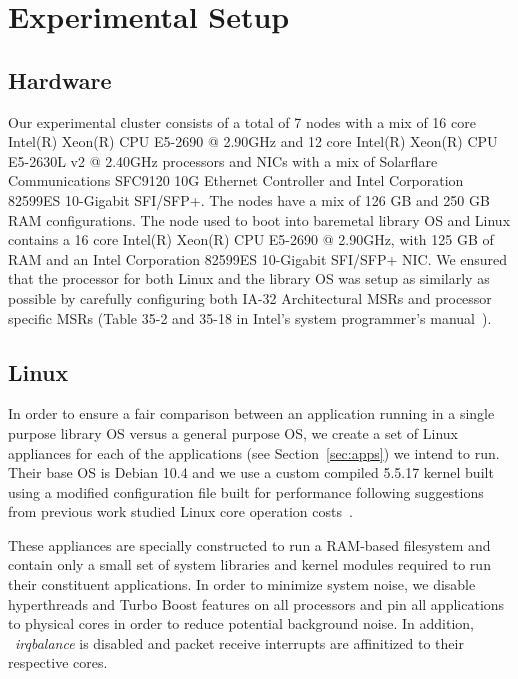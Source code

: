 

\section{Experimental Setup}
\label{sec:exp_setup}
\subsection{Hardware}
Our experimental cluster consists of a total of 7 nodes with a mix of 16 core
Intel(R) Xeon(R) CPU E5-2690 @ 2.90GHz and 12 core Intel(R) Xeon(R) CPU
E5-2630L v2 @ 2.40GHz processors and NICs with a mix of Solarflare
Communications SFC9120 10G Ethernet Controller and Intel Corporation 82599ES
10-Gigabit SFI/SFP+.
The nodes have a mix of 126 GB and 250 GB RAM configurations.
The node used to boot into baremetal library OS and Linux contains a 16 core
Intel(R) Xeon(R) CPU E5-2690 @ 2.90GHz, with 125 GB of RAM and an Intel
Corporation 82599ES 10-Gigabit SFI/SFP+ NIC.
We ensured that the processor for both Linux and the library OS was setup as
similarly as possible by carefully configuring both IA-32 Architectural MSRs
and processor specific MSRs (Table 35-2 and 35-18 in Intel's system
programmer's manual~\cite{intel_msr}).

\subsection{Linux}
In order to ensure a fair comparison between an application running in a single
purpose library OS versus a general purpose OS, we create a set of Linux
appliances for each of the applications (see Section~\ref{sec:apps}) we intend
to run.
Their base OS is Debian 10.4 and we use a custom compiled 5.5.17 kernel built
using a modified configuration file built for performance following suggestions
from previous work studied Linux core operation
costs~\cite{10.1145/3341301.3359640}.

These appliances are specially constructed to run a RAM-based filesystem and
contain only a small set of system libraries and kernel modules required to run
their constituent applications. In order to minimize system noise, we disable
hyperthreads and Turbo Boost features on all  processors and pin all
applications to physical cores in order to reduce potential background noise.
In addition, ~\textit{irqbalance} is disabled and packet receive interrupts are
affinitized to their respective cores.

